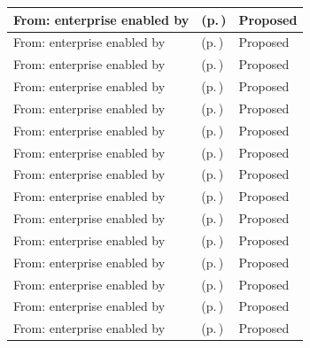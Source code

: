 \begin{longtable}{|>{\raggedright\arraybackslash}p{0.27\TableWidth}|>{\raggedright\arraybackslash}p{0.48\TableWidth}|>{\raggedright\arraybackslash}p{0.25\TableWidth}|}
From: enterprise enabled by & \nameref{cap:bec-order-administration} (p.\,\pageref{cap:bec-order-administration}) & Proposed\\\hline
From: enterprise enabled by & \nameref{cap:bec-diagnostic-administration} (p.\,\pageref{cap:bec-diagnostic-administration}) & Proposed\\\hline
From: enterprise enabled by & \nameref{cap:bec-medication-administration} (p.\,\pageref{cap:bec-medication-administration}) & Proposed\\\hline
From: enterprise enabled by & \nameref{cap:bec-procedure-administration} (p.\,\pageref{cap:bec-procedure-administration}) & Proposed\\\hline
From: enterprise enabled by & \nameref{cap:bec-episode-encounter-administration} (p.\,\pageref{cap:bec-episode-encounter-administration}) & Proposed\\\hline
From: enterprise enabled by & \nameref{cap:bec-clinical-record-administration} (p.\,\pageref{cap:bec-clinical-record-administration}) & Proposed\\\hline
From: enterprise enabled by & \nameref{cap:bec-patient-clinical-record} (p.\,\pageref{cap:bec-patient-clinical-record}) & Proposed\\\hline
From: enterprise enabled by & \nameref{cap:bec-care-plan-administration} (p.\,\pageref{cap:bec-care-plan-administration}) & Proposed\\\hline
From: enterprise enabled by & \nameref{cap:bec-clinic-practice-operations} (p.\,\pageref{cap:bec-clinic-practice-operations}) & Proposed\\\hline
From: enterprise enabled by & \nameref{cap:bec-ward-operations} (p.\,\pageref{cap:bec-ward-operations}) & Proposed\\\hline
From: enterprise enabled by & \nameref{cap:bec-theatre-operations} (p.\,\pageref{cap:bec-theatre-operations}) & Proposed\\\hline
From: enterprise enabled by & \nameref{cap:bec-emergency-department-operations} (p.\,\pageref{cap:bec-emergency-department-operations}) & Proposed\\\hline
From: enterprise enabled by & \nameref{cap:bec-outpatient-operations} (p.\,\pageref{cap:bec-outpatient-operations}) & Proposed\\\hline
From: enterprise enabled by & \nameref{cap:bec-mobile-staff-management} (p.\,\pageref{cap:bec-mobile-staff-management}) & Proposed\\\hline
From: enterprise enabled by & \nameref{cap:bec-service-capacity-management} (p.\,\pageref{cap:bec-service-capacity-management}) & Proposed\\\hline

\end{longtable}
